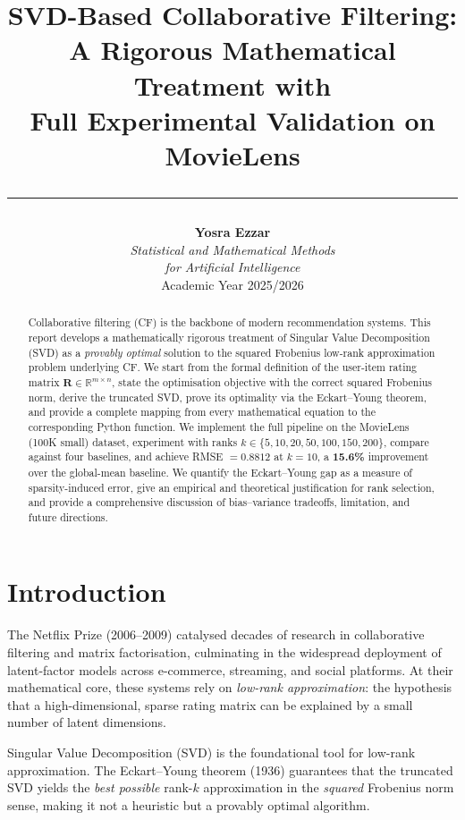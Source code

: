 \documentclass[12pt, a4paper]{article}
\title{%
  {\color{CourseDark}\textbf{SVD-Based Collaborative Filtering:}}\\[6pt]
  {\large\color{CourseTeal!80!black}
   A Rigorous Mathematical Treatment with\\[2pt]
   Full Experimental Validation on MovieLens}\\[4pt]
  \noindent\textcolor{CourseTeal}{\rule{\textwidth}{1.5pt}}
}
\author{%
  \textbf{Yosra Ezzar}\\[6pt]
  \normalsize\textit{Statistical and Mathematical Methods}\\[1pt]
  \normalsize\textit{for Artificial Intelligence}\\[6pt]
  \normalsize Academic Year 2025/2026
}
\date{}
\newcommand{\R}{\mathbb{R}}
\newcommand{\Rmat}{\mathbf{R}}
\begin{document}
\maketitle
\tableofcontents
\newpage

\begin{abstract}
\noindent
Collaborative filtering (CF) is the backbone of modern recommendation
systems.  This report develops a mathematically rigorous treatment of
Singular Value Decomposition (SVD) as a \emph{provably optimal} solution
to the squared Frobenius low-rank approximation problem underlying CF.
We start from the formal definition of the user-item rating matrix
$\Rmat \in \R^{m \times n}$, state the optimisation objective with the
correct squared Frobenius norm, derive the truncated SVD, prove its
optimality via the Eckart--Young theorem, and provide a complete mapping
from every mathematical equation to the corresponding Python function.
We implement the full pipeline on the MovieLens (100K small) dataset,
experiment with ranks $k \in \{5,10,20,50,100,150,200\}$, compare against
four baselines, and achieve RMSE $= 0.8812$ at $k=10$, a \textbf{15.6\%}
improvement over the global-mean baseline.  We quantify the
Eckart--Young gap as a measure of sparsity-induced error, give an
empirical and theoretical justification for rank selection, and provide
a comprehensive discussion of bias--variance tradeoffs, limitation, and
future directions.
\end{abstract}

\section{Introduction}
\label{sec:intro}

The Netflix Prize (2006--2009) catalysed decades of research in
collaborative filtering and matrix factorisation, culminating in the
widespread deployment of latent-factor models across e-commerce,
streaming, and social platforms.  At their mathematical core, these
systems rely on \emph{low-rank approximation}: the hypothesis that a
high-dimensional, sparse rating matrix can be explained by a small
number of latent dimensions.

Singular Value Decomposition (SVD) is the foundational tool for
low-rank approximation.  The Eckart--Young theorem (1936) guarantees
that the truncated SVD yields the \emph{best possible} rank-$k$
approximation in the \emph{squared} Frobenius norm sense, making it not
a heuristic but a provably optimal algorithm.
\end{document}
